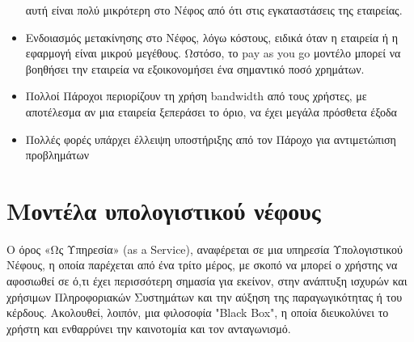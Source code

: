 \documentclass{article}
\begin{document}
\begin{itemize}
αυτή είναι πολύ μικρότερη στο Νέφος από ότι στις εγκαταστάσεις της
εταιρείας.
\item        Ενδοιασμός μετακίνησης στο Νέφος, λόγω κόστους, ειδικά όταν η
εταιρεία ή η εφαρμογή είναι μικρού μεγέθους. Ωστόσο, το
pay as you go μοντέλο μπορεί
να βοηθήσει την εταιρεία να εξοικονομήσει ένα σημαντικό ποσό χρημάτων.
\item        Πολλοί Πάροχοι περιορίζουν τη χρήση
bandwidth από τους χρήστες,
με αποτέλεσμα αν μια εταιρεία ξεπεράσει το όριο, να έχει μεγάλα πρόσθετα
έξοδα
\item        Πολλές φορές υπάρχει έλλειψη υποστήριξης από τον Πάροχο για
αντιμετώπιση προβλημάτων
\end{itemize}










\section{Μοντέλα υπολογιστικού νέφους}
Ο όρος «Ως Υπηρεσία» (as a Service),
αναφέρεται σε μια υπηρεσία Υπολογιστικού Νέφους, η
οποία παρέχεται από ένα τρίτο μέρος, με σκοπό να μπορεί ο χρήστης να
αφοσιωθεί σε ό,τι έχει περισσότερη σημασία για εκείνον, στην ανάπτυξη
ισχυρών και χρήσιμων Πληροφοριακών Συστημάτων και την αύξηση της
παραγωγικότητας ή του κέρδους. Ακολουθεί, λοιπόν, μια φιλοσοφία
"Black Box", η οποία
διευκολύνει το χρήστη και ενθαρρύνει την καινοτομία και τον ανταγωνισμό.
\end{document}

